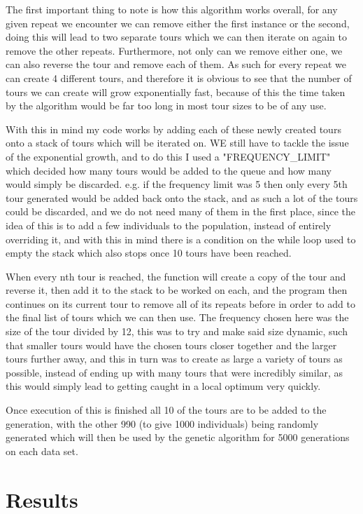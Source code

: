 \documentclass[11pt,a4paper,titlepage]{article}
\begin{document}
The first important thing to note is how this algorithm works overall, for any given repeat we encounter we can remove either the first instance or the second, doing this will lead to two separate tours which we can then iterate on again to remove the other repeats. Furthermore, not only can we remove either one, we can also reverse the tour and remove each of them. As such for every repeat we can create 4 different tours, and therefore it is obvious to see that the number of tours we can create will grow exponentially fast, because of this the time taken by the algorithm would be far too long in most tour sizes to be of any use.

With this in mind my code works by adding each of these newly created tours onto a stack of tours which will be iterated on. WE still have to tackle the issue of the exponential growth, and to do this I used a "FREQUENCY\_LIMIT" which decided how many tours would be added to the queue and how many would simply be discarded. e.g. if the frequency limit was 5 then only every 5th tour generated would be added back onto the stack, and as such a lot of the tours could be discarded, and we do not need many of them in the first place, since the idea of this is to add a few individuals to the population, instead of entirely overriding it, and with this in mind there is a condition on the while loop used to empty the stack which also stops once 10 tours have been reached.

When every nth tour is reached, the function will create a copy of the tour and reverse it, then add it to the stack to be worked on each, and the program then continues on its current tour to remove all of its repeats before in order to add to the final list of tours which we can then use. The frequency chosen here was the size of the tour divided by 12, this was to try and make said size dynamic, such that smaller tours would have the chosen tours closer together and the larger tours further away, and this in turn was to create as large a variety of tours as possible, instead of ending up with many tours that were incredibly similar, as this would simply lead to getting caught in a local optimum very quickly.

Once execution of this is finished all 10 of the tours are to be added to the generation, with the other 990 (to give 1000 individuals) being randomly generated which will then be used by the genetic algorithm for 5000 generations on each data set.

\section{Results}
\end{document}

